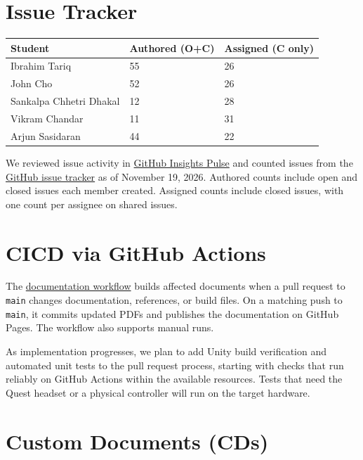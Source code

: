 \documentclass{article}
\begin{document}
\section{Issue Tracker}

\begin{table}[H]
\centering
\begin{tabular}{lll}
\toprule
\textbf{Student} & \textbf{Authored (O+C)} & \textbf{Assigned (C only)}\\
\midrule
Ibrahim Tariq & 55 & 26 \\
John Cho & 52 & 26 \\
Sankalpa Chhetri Dhakal & 12 & 28 \\
Vikram Chandar & 11 & 31 \\
Arjun Sasidaran & 44 & 22 \\
\bottomrule
\end{tabular}
\end{table}

We reviewed issue activity in
\href{https://github.com/SoftwareMandems/FPVR/pulse}{GitHub Insights Pulse}
and counted issues from the
\href{https://github.com/SoftwareMandems/FPVR/issues}{GitHub issue tracker}
as of November 19, 2026. Authored counts include open and closed issues each
member created. Assigned counts include closed issues, with one count per
assignee on shared issues.

\section{CICD via GitHub Actions}

The \href{https://github.com/SoftwareMandems/FPVR/blob/main/.github/workflows/latex-pages.yml}{documentation workflow}
builds affected documents when a pull request to \texttt{main} changes
documentation, references, or build files. On a matching push to
\texttt{main}, it commits updated PDFs and publishes the documentation on
GitHub Pages. The workflow also supports manual runs.

As implementation progresses, we plan to add Unity build verification and
automated unit tests to the pull request process, starting with checks that
run reliably on GitHub Actions within the available resources. Tests that
need the Quest headset or a physical controller will run on the target
hardware.

\section{Custom Documents (CDs)}
\end{document}
